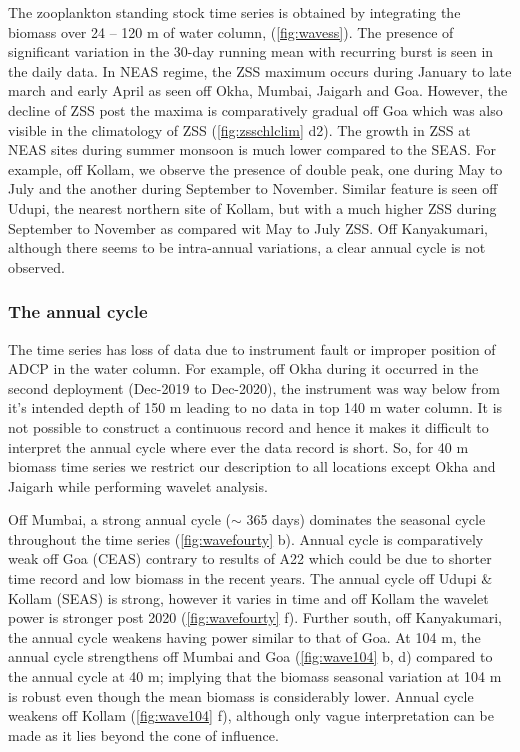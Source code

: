 \documentclass{article}
\begin{document}
	The zooplankton standing stock time series is obtained by integrating the biomass over 24 -- 120 m of water column, (\cref{fig:wavess}). The presence of significant variation in the 30-day running mean with recurring burst is seen in the daily data. 
	In NEAS regime, the ZSS maximum occurs during January to late march and early April as seen off Okha, Mumbai, Jaigarh and Goa. However, the decline of ZSS post the maxima is comparatively gradual off Goa which was also visible in the climatology of ZSS (\cref{fig:zsschlclim} d2). The growth in ZSS at NEAS sites during summer monsoon is much lower compared to the SEAS. For example, off Kollam, we observe the presence of double peak, one during May to July and the another during September to November. Similar feature is seen off Udupi, the nearest northern site of Kollam, but with a much higher ZSS during September to November as compared wit May to July ZSS. Off Kanyakumari, although there seems to be intra-annual variations, a clear annual cycle is not observed.
	
	\subsubsection{The annual cycle}
	The time series has loss of data due to instrument fault or improper position of ADCP in the water column. For example, off Okha during it occurred in the second deployment (Dec-2019 to Dec-2020), the instrument was way below from it's intended depth of 150 m leading to no data in top 140 m water column. It is not possible to construct a continuous record and hence it makes it difficult to interpret the annual cycle where ever the data record is short. So, for 40 m biomass time series we restrict our description to all locations except Okha and Jaigarh while performing wavelet analysis.

	Off Mumbai, a strong annual cycle ($\sim$ 365 days) dominates the seasonal cycle throughout the time series (\cref{fig:wavefourty} b). Annual cycle is comparatively weak off Goa (CEAS) contrary to results of A22 which could be due to shorter time record and low biomass in the recent years. The annual cycle off Udupi \& Kollam (SEAS) is strong, however it varies in time and off Kollam the wavelet power is stronger post 2020 (\cref{fig:wavefourty} f). Further south, off Kanyakumari, the annual cycle weakens having power similar to that of Goa. At 104 m, the annual cycle strengthens off Mumbai and Goa (\cref{fig:wave104} b, d) compared to the annual cycle at 40 m; implying that the biomass seasonal variation at 104 m is robust even though the mean biomass is considerably lower. Annual cycle weakens off Kollam (\cref{fig:wave104} f), although only vague interpretation can be made as it lies beyond the cone of influence. 
\end{document}
